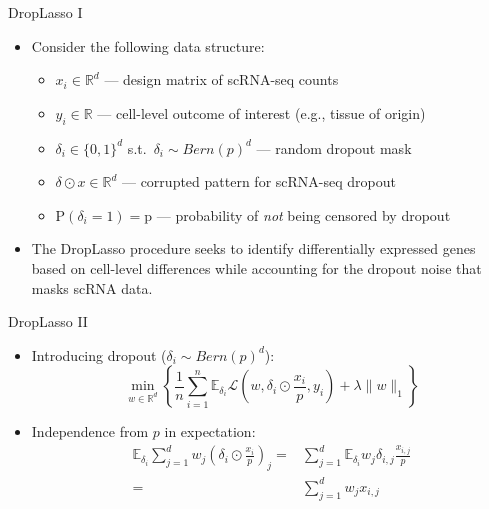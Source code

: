 \documentclass{beamer}
\newcommand{\R}{\mathbb{R}}
\newcommand{\E}{\mathbb{E}}
\newcommand{\lik}{\mathcal{L}}
\begin{document}
\begin{frame}{DropLasso I}

\begin{itemize}
  \itemsep12pt
  \item Consider the following data structure:
    \begin{itemize}
      \itemsep10pt
      \item $x_i \in \mathbb{R}^d$ --- design matrix of scRNA-seq counts
      \item $y_i \in \mathbb{R}$ --- cell-level outcome of interest (e.g.,
        tissue of origin)
      \item $\delta_i \in \{0, 1\}^d$ s.t.~$\delta_i \sim Bern(p)^d$ --- random
        dropout mask
      \item $\delta \odot x \in \mathbb{R}^d$ --- corrupted pattern for
        scRNA-seq dropout
      \item $\text{P}(\delta_i = 1) = \text{p}$ --- probability of \textit{not}
        being censored by dropout
    \end{itemize}
  \item The DropLasso procedure seeks to identify differentially expressed genes
    based on cell-level differences while accounting for the dropout noise that
    masks scRNA data.
\end{itemize}

\end{frame}


\begin{frame}{DropLasso II}

\begin{itemize}
  \itemsep12pt
  \item Introducing dropout ($\delta_i \sim Bern(p)^d$):
    \[
      \min_{w \in \R^d} \left\{ \frac{1}{n} \sum_{i = 1}^n \E_{\delta_i}
        \lik \left(w, \delta_i \odot \frac{x_i}{p}, y_i \right) + \lambda
        \lVert w \rVert_1 \right\}
    \]
  \item Independence from $p$ in expectation:
    \[
      \begin{aligned}
      \E_{\delta_i} \sum_{j = 1}^{d} w_j \left( \delta_i \odot \frac{x_i}{p}
      \right)_j =& \sum_{j = 1}^d \E_{\delta_i} w_j \delta_{i,j}
      \frac{x_{i,j}}{p} \\ =& \sum_{j = 1}^d w_j x_{i,j}
      \end{aligned}
    \]
\end{itemize}

\end{frame}
\end{document}
